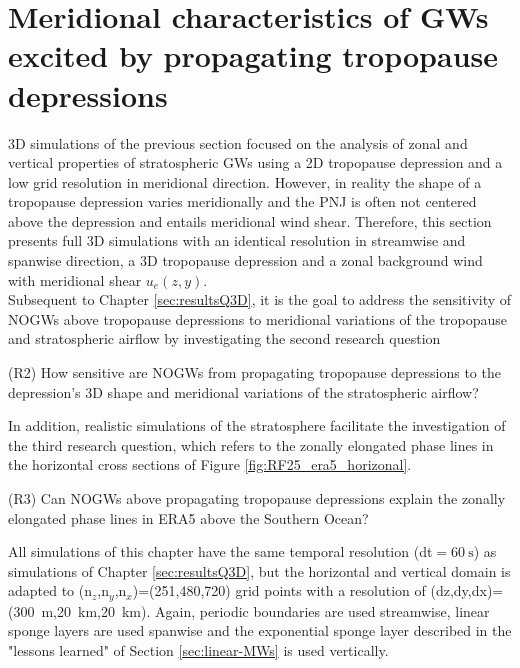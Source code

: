 \chapter{Meridional characteristics of GWs excited by propagating tropopause depressions}
\label{sec:results3D}
3D simulations of the previous section focused on the analysis of zonal and vertical properties of stratospheric GWs using a 2D tropopause depression and a low grid resolution in meridional direction. However, in reality the shape of a tropopause depression varies meridionally and the PNJ is often not centered above the depression and entails meridional wind shear. Therefore, this section presents full 3D simulations with an identical resolution in streamwise and spanwise direction, a 3D tropopause depression and a zonal background wind with meridional shear $u_e(z,y)$. \\
Subsequent to Chapter \ref{sec:resultsQ3D}, it is the goal to address the sensitivity of NOGWs above tropopause depressions to meridional variations of the tropopause and stratospheric airflow by investigating the second research question
\begin{tcolorbox}[]
    (R2) How sensitive are NOGWs from propagating tropopause depressions to the depression's 3D shape and meridional variations of the stratospheric airflow?
\end{tcolorbox}
In addition, realistic simulations of the stratosphere facilitate the investigation of the third research question, which refers to the zonally elongated phase lines in the horizontal cross sections of Figure \ref{fig:RF25_era5_horizonal}.
\begin{tcolorbox}[]
    (R3) Can NOGWs above propagating tropopause depressions explain the zonally elongated phase lines in ERA5 above the Southern Ocean?
\end{tcolorbox}
All simulations of this chapter have the same temporal resolution (dt$=\SI{60}{\second}$) as simulations of Chapter \ref{sec:resultsQ3D}, but the horizontal and vertical domain is adapted to (n$_z$,n$_y$,n$_x$)=(251,480,720) grid points with a resolution of (dz,dy,dx)=(\SI{300}{\meter},\SI{20}{\kilo\meter},\SI{20}{\kilo\meter}). Again, periodic boundaries are used streamwise, linear sponge layers are used spanwise and the exponential sponge layer described in the "lessons learned" of Section \ref{sec:linear-MWs} is used vertically.

